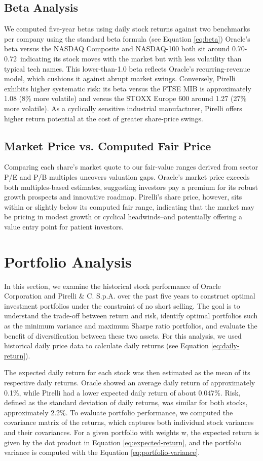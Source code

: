 \documentclass[12pt,a4paper]{report}
\begin{document}
\section{Beta Analysis}
We computed five-year betas using daily stock returns against two benchmarks per company using the standard beta formula (see Equation \ref{eq:beta}) Oracle's beta versus the NASDAQ Composite and NASDAQ-100 both sit around 0.70-0.72\, indicating its stock moves with the market but with less volatility than typical tech names. This lower-than-1.0 beta reflects Oracle's recurring-revenue model, which cushions it against abrupt market swings. Conversely, Pirelli exhibits higher systematic risk: its beta versus the FTSE MIB is approximately 1.08 (8\% more volatile) and versus the STOXX Europe 600 around 1.27 (27\% more volatile). As a cyclically sensitive industrial manufacturer, Pirelli offers higher return potential at the cost of greater share-price swings.
\section{Market Price vs. Computed Fair Price}
Comparing each share's market quote to our fair-value ranges derived from sector P/E and P/B multiples uncovers valuation gaps. Oracle's market price exceeds both multiples-based estimates, suggesting investors pay a premium for its robust growth prospects and innovative roadmap. Pirelli's share price, however, sits within or slightly below its computed fair range, indicating that the market may be pricing in modest growth or cyclical headwinds--and potentially offering a value entry point for patient investors.


\chapter{Portfolio Analysis}
In this section,  we examine the historical stock performance of Oracle Corporation and Pirelli \& C. S.p.A. over the past five years to construct optimal investment portfolios under the constraint of no short selling. The goal is to understand the trade-off between return and risk, identify optimal portfolios such as the minimum variance and maximum Sharpe ratio portfolios, and evaluate the benefit of diversification between these two assets. For this analysis, we used historical daily price data to calculate daily returns (see Equation \ref{eq:daily-return}).

The expected daily return for each stock was then estimated as the mean of its respective daily returns. Oracle showed an average daily return of approximately 0.1\%, while Pirelli had a lower expected daily return of about 0.047\%. Risk, defined as the standard deviation of daily returns, was similar for both stocks, approximately 2.2\%. To evaluate portfolio performance, we computed the covariance matrix of the returns, which captures both individual stock variances and their covariances. For a given portfolio with weights w, the expected return is given by the dot product in Equation \ref{eq:expected-return}, and the portfolio variance is computed with the Equation \ref{eq:portfolio-variance}.
\end{document}
